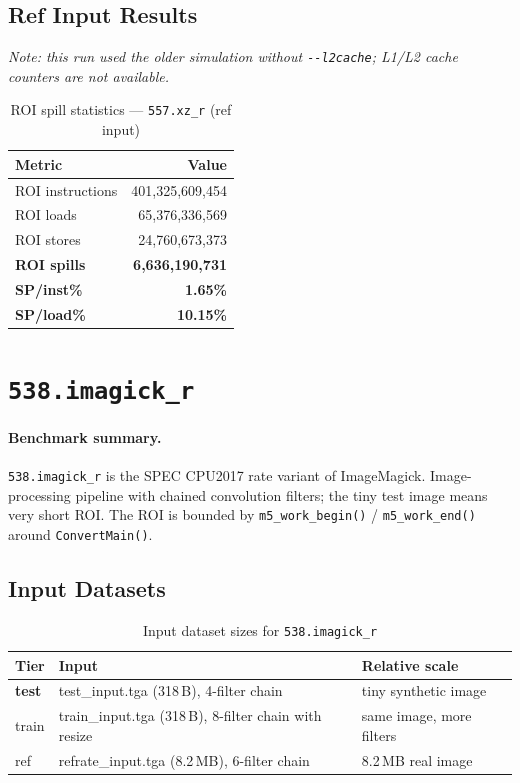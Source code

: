 \documentclass[11pt,a4paper]{article}
\begin{document}
\subsection{Ref Input Results}

\textit{Note: this run used the older simulation without \texttt{-{}-l2cache}; L1/L2 cache counters are not available.}


\begin{table}[H]
\centering
\caption{ROI spill statistics --- \texttt{557.xz\_r} (ref input)}
\label{tab:xz_ref_roi}
\begin{tabular}{lr}
\toprule
\textbf{Metric} & \textbf{Value} \\
\midrule
ROI instructions & 401,325,609,454 \\
ROI loads        & 65,376,336,569 \\
ROI stores       & 24,760,673,373 \\
\textbf{ROI spills}   & \textbf{6,636,190,731} \\
\textbf{SP/inst\%}   & \textbf{1.65\%} \\
\textbf{SP/load\%}   & \textbf{10.15\%} \\
\bottomrule
\end{tabular}
\end{table}


\section{\texttt{538.imagick\_r}}
\label{sec:imagick}

\paragraph{Benchmark summary.}
\texttt{538.imagick\_r} is the SPEC CPU2017 rate variant of ImageMagick.
Image-processing pipeline with chained convolution filters; the tiny test image means very short ROI.
The ROI is bounded by \texttt{m5\_work\_begin()} / \texttt{m5\_work\_end()}
around \texttt{ConvertMain()}.

\subsection{Input Datasets}

\begin{table}[H]
\centering
\caption{Input dataset sizes for \texttt{538.imagick\_r}}
\label{tab:imagick_inputs}
\small
\begin{tabular}{lp{8cm}l}
\toprule
\textbf{Tier} & \textbf{Input} & \textbf{Relative scale} \\
\midrule
\textbf{test} & test\_input.tga (318\,B), 4-filter chain & tiny synthetic image \\
train & train\_input.tga (318\,B), 8-filter chain with resize & same image, more filters \\
ref & refrate\_input.tga (8.2\,MB), 6-filter chain & 8.2\,MB real image \\
\bottomrule
\end{tabular}
\end{table}
\end{document}
